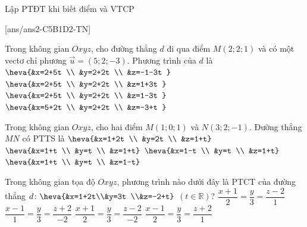 \begin{dang}{Lập PTĐT khi biết điểm và VTCP}

\end{dang}
\TN
{}[ans/ans2-C5B1D2-TN]
\begin{ex}%
	Trong không gian $Oxyz$, cho đường thẳng $d$ đi qua điểm $M(2; 2; 1)$ và có một vectơ chỉ phương $\overrightarrow{u}=(5; 2;-3)$. Phương trình của $d$ là
	\choice
	{$\heva{&x=2+5t \\
			&y=2+2t \\
			&z=-1-3t
		}$}
	{$\heva{&x=2+5t \\
			&y=2+2t \\
			&z=1+3t
		}$}
	{\True $\heva{&x=2+5t \\
			&y=2+2t \\
			&z=1-3t
		}$}
	{$\heva{&x=5+2t \\
			&y=2+2t \\
			&z=-3+t
		}$}
\end{ex}
\begin{ex}%
	Trong không gian $Oxyz$, cho hai điểm $M(1; 0; 1)$ và $N(3; 2;-1)$. Đường thẳng $MN$ có PTTS là
	\choice
	{$\heva{&x=1+2t \\
			&y=2t \\
			&z=1+t}$}
	{$\heva{&x=1+t \\
			&y=t \\
			&z=1+t}$}
	{$\heva{&x=1-t \\
			&y=t \\
			&z=1+t}$}
	{\True $\heva{&x=1+t \\
			&y=t \\
			&z=1-t}$}
\end{ex}
	\begin{ex}%
		Trong không gian tọa độ $Oxyz$, phương trình nào dưới đây là PTCT của đường thẳng $d\colon\heva{&x=1+2t\\&y=3t \\&z=-2+t}$ $(t\in\mathbb{R})$?
		\choice
		{$\dfrac{x+1}{2}=\dfrac{y}{3}=\dfrac{z-2}{1}$}
		{$\dfrac{x-1}{1}=\dfrac{y}{3}=\dfrac{z+2}{-2}$}
		{$\dfrac{x+1}{2}=\dfrac{y}{3}=\dfrac{z-2}{-2}$}
		{\True $\dfrac{x-1}{2}=\dfrac{y}{3}=\dfrac{z+2}{1}$}
\end{ex}
